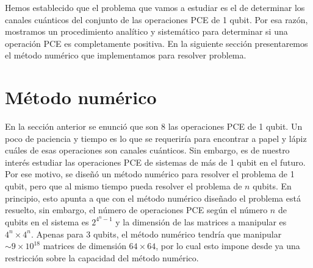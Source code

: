 Hemos establecido que el problema que vamos a 
estudiar es el de determinar los canales cuánticos 
del conjunto de las operaciones PCE de 1 qubit. 
Por esa razón, mostramos un procedimiento analítico
y sistemático para determinar si una operación PCE 
es completamente positiva. 
En la siguiente sección presentaremos el método 
numérico que implementamos para resolver problema.

\section{Método numérico} %





En la sección anterior se enunció que son 8 las operaciones
PCE de 1 qubit. Un poco de paciencia y tiempo es lo que 
se requeriría para encontrar a papel y lápiz cuáles de esas operaciones son
canales cuánticos. Sin embargo, es de nuestro interés estudiar las 
operaciones PCE de sistemas de más de 1 qubit en el futuro. 
Por ese motivo, se diseñó un método numérico para resolver 
el problema de 1 qubit, pero que al mismo tiempo 
pueda resolver el problema de $n$ qubits.
En principio, esto apunta a que con el método numérico 
diseñado el problema está resuelto, sin embargo, 
el número de operaciones PCE según el número $n$ de qubits
en el sistema es $2^{4^n-1}$ y la dimensión de las matrices 
a manipular es $4^n\times4^n$. Apenas para 3 qubits, el método numérico
tendría que manipular $\sim 9\times10^{18}$ matrices de 
dimensión $64\times64$, por lo cual esto impone desde 
ya una restricción sobre la capacidad del método numérico. 

